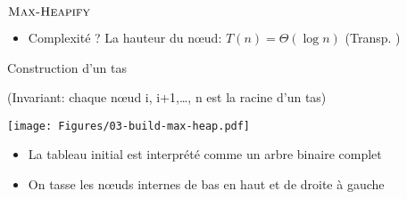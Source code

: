 \begin{frame}{$\textnormal{\scshape Max-Heapify}$}

\begin{center}
\begin{small}
\end{small}
\end{center}

\bigskip

\begin{itemize}
\item Complexité ? La hauteur du n\oe ud: $T(n)=\Theta(\log n)$ (Transp. \pageref{03:hauteurtas})
\end{itemize}


\end{frame}

\begin{frame}{Construction d'un tas}

\begin{center}\small
{}
\end{center}
{\footnotesize (Invariant: chaque n\oe ud i, i+1,\ldots, n est la racine d'un tas)}
\bigskip

\centerline{\texttt{[image: Figures/03-build-max-heap.pdf]}}

\bigskip

\begin{itemize}
\item La tableau initial est interprété comme un arbre binaire complet
\item On tasse les n\oe uds internes de bas en haut et de droite à gauche
\end{itemize}


\end{frame}

